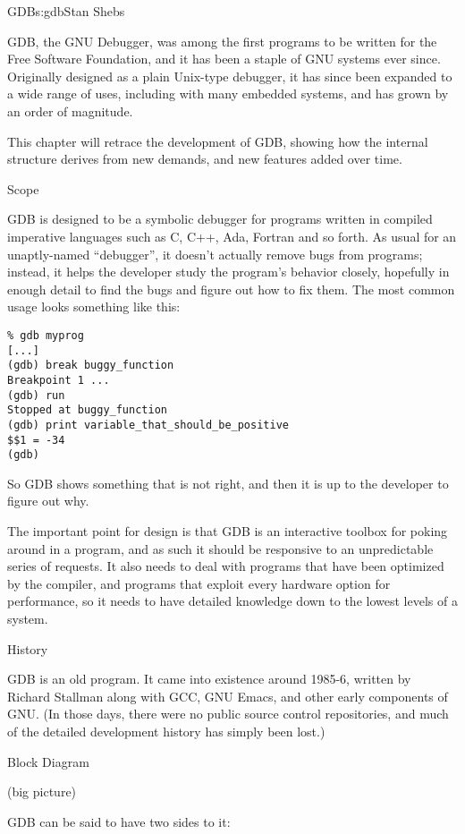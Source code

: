 \begin{aosachapter}{GDB}{s:gdb}{Stan Shebs}

GDB, the GNU Debugger, was among the first programs to be written for
the Free Software Foundation, and it has been a staple of GNU systems
ever since.  Originally designed as a plain Unix-type debugger, it has
since been expanded to a wide range of uses, including with many
embedded systems, and has grown by an order of magnitude.

This chapter will retrace the development of GDB, showing how the
internal structure derives from new demands, and new features added
over time.

Scope

GDB is designed to be a symbolic debugger for programs written in
compiled imperative languages such as C, C++, Ada, Fortran and so
forth.  As usual for an unaptly-named ``debugger'', it doesn't
actually remove bugs from programs; instead, it helps the developer
study the program's behavior closely, hopefully in enough detail to
find the bugs and figure out how to fix them.  The most common usage
looks something like this:

\begin{verbatim}
% gdb myprog
[...]
(gdb) break buggy_function
Breakpoint 1 ...
(gdb) run
Stopped at buggy_function
(gdb) print variable_that_should_be_positive
$$1 = -34
(gdb)
\end{verbatim}

So GDB shows something that is not right, and then it is up to the developer
to figure out why.

The important point for design is that GDB is an interactive toolbox
for poking around in a program, and as such it should be responsive
to an unpredictable series of requests.  It also needs to deal with
programs that have been optimized by the compiler, and programs that
exploit every hardware option for performance, so it needs to have
detailed knowledge down to the lowest levels of a system.

History

GDB is an old program.  It came into existence around 1985-6, written
by Richard Stallman along with GCC, GNU Emacs, and other early
components of GNU.  (In those days, there were no public source
control repositories, and much of the detailed development history
has simply been lost.)

Block Diagram

(big picture)

GDB can be said to have two sides to it:


\end{aosachapter}
